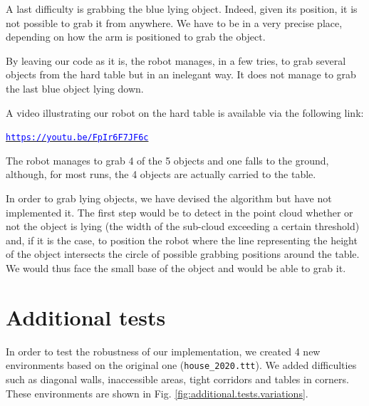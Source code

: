 \documentclass[a4paper, 10pt, conference]{ieeeconf}
\begin{document}
    A last difficulty is grabbing the blue lying object. Indeed, given its position, it is not possible to grab it from anywhere. We have to be in a very precise place, depending on how the arm is positioned to grab the object.
    
    By leaving our code as it is, the robot manages, in a few tries, to grab several objects from the hard table but in an inelegant way. It does not manage to grab the last blue object lying down.
    
    A video illustrating our robot on the hard table is available via the following link:
    
    \begin{center}
        \href{https://youtu.be/FpIr6F7JF6c}{\texttt{\textcolor{blue}{https://youtu.be/FpIr6F7JF6c}}}
    \end{center}
    
    The robot manages to grab 4 of the 5 objects and one falls to the ground, although, for most runs, the 4 objects are actually carried to the table.
    
    In order to grab lying objects, we have devised the algorithm but have not implemented it. The first step would be to detect in the point cloud whether or not the object is lying (the width of the sub-cloud exceeding a certain threshold) and, if it is the case, to position the robot where the line representing the height of the object intersects the circle of possible grabbing positions around the table. We would thus face the small base of the object and would be able to grab it.
    
    
    \section{Additional tests}
    
    In order to test the robustness of our implementation, we created 4 new environments based on the original one (\texttt{house\_2020.ttt}). We added difficulties such as diagonal walls, inaccessible areas, tight corridors and tables in corners. These environments are shown in Fig. \ref{fig:additional.tests.variations}.
    
\end{document}
